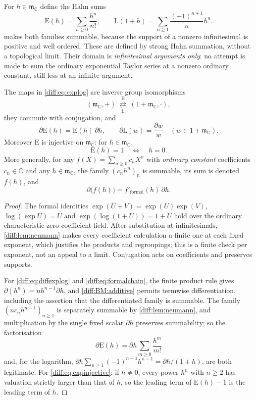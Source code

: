 \documentclass[11pt,letterpaper]{article}
\numberwithin{equation}{section}
\theoremstyle{definition}
\theoremstyle{remark}
\newcommand{\C}{\mathbb C}
\newcommand{\der}{\partial}
\newcommand{\mm}{\mathfrak m}
\newcommand{\Emm}{\mathrm{E}}
\newcommand{\Lmm}{\mathrm{L}}
\begin{document}
For $h\in\mm_{\C}$ define the Hahn sums
\begin{equation}\label{diff:eq:explog}
 \Emm(h)=\sum_{n\geq0}\frac{h^{n}}{n!},
 \qquad
 \Lmm(1+h)=\sum_{n\geq1}\frac{(-1)^{n+1}}{n}h^{n}.
\end{equation}
 makes both families summable, because the support of a
nonzero infinitesimal is positive and well ordered. These are defined by strong Hahn summation, without a topological limit. Their domain is
\emph{infinitesimal arguments only}: no attempt is made to sum the ordinary
exponential Taylor series at a nonzero ordinary constant, still less at an
infinite argument.

\begin{lemma}
\label{diff:lem:smallchain}
The maps in \cref{diff:eq:explog} are inverse group isomorphisms
\[
 (\mm_{\C},+)\ \underset{\Lmm}{\overset{\Emm}{\rightleftarrows}}\
 (1+\mm_{\C},\cdot),
\]
they commute with conjugation, and
\begin{equation}\label{diff:eq:diffexplog}
 \der\Emm(h)=\Emm(h)\,\der h,
 \qquad
 \der\Lmm(w)=\frac{\der w}{w}\quad(w\in1+\mm_{\C}).
\end{equation}
Moreover $\Emm$ is injective on $\mm_{\C}$: for $h\in\mm_{\C}$,
\begin{equation}\label{diff:eq:expinjective}
 \Emm(h)=1\quad\Longleftrightarrow\quad h=0 .
\end{equation}
More generally, for any $f(X)=\sum_{n\geq0}c_{n}X^{n}$ with
\emph{ordinary constant} coefficients $c_{n}\in\C$ and any $h\in\mm_{\C}$, the
family $(c_{n}h^{n})_{n}$ is summable, its sum is denoted $f(h)$, and
\begin{equation}\label{diff:eq:formalchain}
 \der\bigl(f(h)\bigr)=f'_{\mathrm{formal}}(h)\,\der h .
\end{equation}
\end{lemma}
\begin{proof}
The formal identities $\exp(U+V)=\exp(U)\exp(V)$, $\log(\exp U)=U$ and
$\exp(\log(1+U))=1+U$ hold over the ordinary characteristic-zero coefficient
field. After substitution at infinitesimals, \cref{diff:lem:neumann} makes
every coefficient calculation a finite one at each fixed exponent, which
justifies the products and regroupings; this is a finite check per exponent,
not an appeal to a limit. Conjugation acts on coefficients and preserves
supports.

For \cref{diff:eq:diffexplog} and \cref{diff:eq:formalchain}, the finite
product rule gives $\der(h^{n})=nh^{n-1}\der h$, and \ref{diff:BM:additive}
permits termwise differentiation, including the assertion that the
differentiated family is summable. The family
$(nc_{n}h^{n-1})_{n\geq1}$ is separately summable by \cref{diff:lem:neumann},
and multiplication by the single fixed scalar $\der h$ preserves summability;
so the factorisation
\[
 \der\Emm(h)=\der h\sum_{m\geq0}\frac{h^{m}}{m!}
\]
and, for the logarithm, $\der h\sum_{n\geq1}(-1)^{n+1}h^{n-1}=\der h/(1+h)$,
are both legitimate. For \cref{diff:eq:expinjective}: if $h\neq0$, every power
$h^{n}$ with $n\geq2$ has valuation strictly larger than that of $h$, so the
leading term of $\Emm(h)-1$ is the leading term of $h$.
\end{proof}
\end{document}
